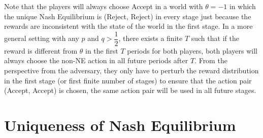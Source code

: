 \documentclass{article}
\begin{document}
\newline \newline
Note that the players will always choose Accept in a world with $\theta = -1$ in which the unique Nash Equilibrium is (Reject, Reject) in every stage just because the rewards are inconsistent with the state of the world in the first stage. In a more general setting with any $p $ and $q  > \dfrac{1}{2}$, there exists a finite $T $ such that if the reward is different from $\theta$ in the first $T $ periods for both players, both players will always choose the non-NE action in all future periods after $T. $
\newline \newline
From the perspective from the adversary, they only have to perturb the reward distribution in the first stage (or first finite number of stages) to ensure that the action pair (Accept, Accept) is chosen, the same action pair will be used in all future stages.
\newline \newline



\section{Uniqueness of Nash Equilibrium} 
\end{document}
